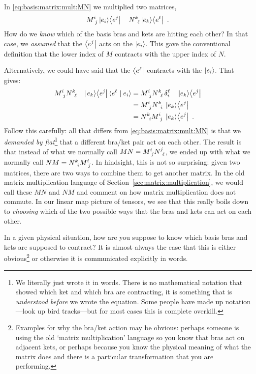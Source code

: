 \begin{example}\label{eg:contraction:choices}
In \eqref{eq:basis:matrix:mult:MN} we multiplied two matrices,
\begin{align}
     M\aij{i}{j} \ket{e_i}\! \bra{e^j} \quad N\aij{k}{\ell}  \ket{e_k}\!\bra{e^\ell} \ .
\end{align}
How do we \emph{know} which of the basis bras and kets are hitting each other? In that case, we \emph{assumed} that the $\left\langle e^j\right|$ acts on the $\left|e_i\right\rangle$. This gave the conventional definition that the lower index of $M$ contracts with the upper index of $N$. 

Alternatively, we could have said that the $\left\langle e^\ell\right|$ contracts with the $\left|e_i\right\rangle$. That gives:
\begin{align}
    M\aij{i}{j} N\aij{k}{\ell} 
    \quad \ket{e_k}\! \bra{e^j}   \la {e^\ell} \mid {e_i} \ra
    &=
    M\aij{i}{j} N\aij{k}{\ell}\, \delta^\ell_i \quad \ket{e_k}\! \bra{e^j}
    \\&=
    M\aij{i}{j} N\aij{k}{i} \; \ket{e_k}\! \bra{e^j}
    \\&=
    N\aij{k}{i}M\aij{i}{j} \; \ket{e_k}\! \bra{e^j}\ .
\end{align}
Follow this carefully: all that differs from \eqref{eq:basis:matrix:mult:MN} is that we \emph{demanded by fiat}\footnote{We literally just wrote it in words. There is no mathematical notation that showed which ket and which bra are contracting, it is something that is \emph{understood before} we wrote the equation. Some people have made up notation---look up bird tracks---but for most cases this is complete overkill.} that a different bra/ket pair act on each other. The result is that instead of what we normally call $MN = M\aij{i}{j}N\aij{j}{\ell}$, we ended up with what we normally call $NM= N\aij{k}{i}M\aij{i}{j}$. In hindsight, this is not so surprising: given two matrices, there are two ways to combine them to get another matrix. In the old matrix multiplication language of Section~\ref{sec:matrix:multiplication}, we would call these $MN$ and $NM$ and comment on how matrix multiplication does not commute. In our linear map picture of tensors, we see that this really boils down to \emph{choosing} which of the two possible ways that the bras and kets can act on each other. 

In a given physical situation, how are you suppose to know which basis bras and kets are supposed to contract? It is almost always the case that this is either obvious\footnote{Examples for why the bra/ket action may be obvious: perhaps someone is using the old `matrix multiplication' language so you know that bras act on adjacent kets, or perhaps because you know the physical meaning of what the matrix does and there is a particular transformation that you are performing.} or otherwise it is communicated explicitly in words. 
\end{example}

